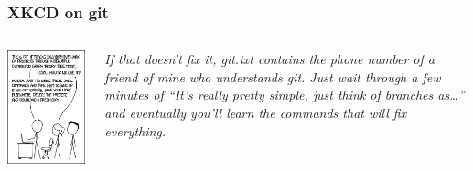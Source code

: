\documentclass[10pt,svgnames,handout]{beamer}
\begin{document}
\appendix

\begin{frame}
\label{xkcd_git}
\frametitle{XKCD on git \hfill\hyperlink{git_cons}{}}

\begin{columns}[T,onlytextwidth]
\includegraphics[width=\textwidth]{figures/xkcd-git.png}

\vfill
\emph{If that doesn't fix it, git.txt contains the phone number of a friend of mine who understands git.
Just wait through a few minutes of “It's really pretty simple, just think of branches as\ldots” and eventually you'll learn the commands that will fix everything.
}
\end{columns}

\end{frame}
\end{document}
